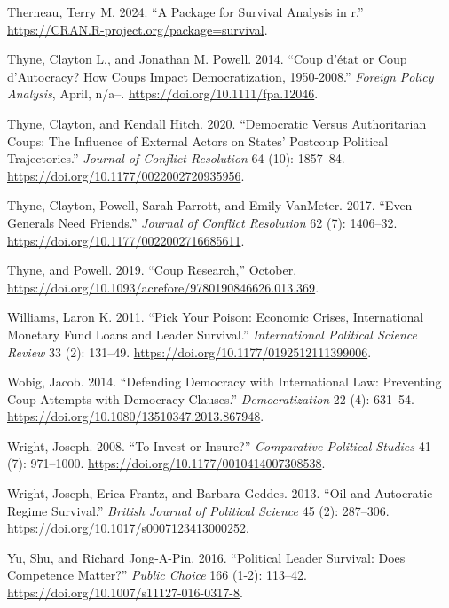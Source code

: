 \documentclass[
  12pt,
]{report}
\newlength{\cslhangindent}
\newenvironment{CSLReferences}[2] %
 {\begin{list}{}{%
  \setlength{\itemindent}{0pt}
  \setlength{\leftmargin}{0pt}
  \setlength{\parsep}{0pt}
  \ifodd #1
   \setlength{\leftmargin}{\cslhangindent}
   \setlength{\itemindent}{-1\cslhangindent}
  \fi
  \setlength{\itemsep}{#2\baselineskip}}}
 {\end{list}}
\begin{document}
\begin{CSLReferences}{1}{0}
Therneau, Terry M. 2024. {``A Package for Survival Analysis in r.''}
\url{https://CRAN.R-project.org/package=survival}.

Thyne, Clayton L., and Jonathan M. Powell. 2014. {``Coup d{'}état or
Coup d'Autocracy? How Coups Impact Democratization, 1950-2008.''}
\emph{Foreign Policy Analysis}, April, n/a--.
\url{https://doi.org/10.1111/fpa.12046}.

Thyne, Clayton, and Kendall Hitch. 2020. {``Democratic Versus
Authoritarian Coups: The Influence of External Actors on States{'}
Postcoup Political Trajectories.''} \emph{Journal of Conflict
Resolution} 64 (10): 1857--84.
\url{https://doi.org/10.1177/0022002720935956}.

Thyne, Clayton, Powell, Sarah Parrott, and Emily VanMeter. 2017. {``Even
Generals Need Friends.''} \emph{Journal of Conflict Resolution} 62 (7):
1406--32. \url{https://doi.org/10.1177/0022002716685611}.

Thyne, and Powell. 2019. {``Coup Research,''} October.
\url{https://doi.org/10.1093/acrefore/9780190846626.013.369}.

Williams, Laron K. 2011. {``Pick Your Poison: Economic Crises,
International Monetary Fund Loans and Leader Survival.''}
\emph{International Political Science Review} 33 (2): 131--49.
\url{https://doi.org/10.1177/0192512111399006}.

Wobig, Jacob. 2014. {``Defending Democracy with International Law:
Preventing Coup Attempts with Democracy Clauses.''}
\emph{Democratization} 22 (4): 631--54.
\url{https://doi.org/10.1080/13510347.2013.867948}.

Wright, Joseph. 2008. {``To Invest or Insure?''} \emph{Comparative
Political Studies} 41 (7): 971--1000.
\url{https://doi.org/10.1177/0010414007308538}.

Wright, Joseph, Erica Frantz, and Barbara Geddes. 2013. {``Oil and
Autocratic Regime Survival.''} \emph{British Journal of Political
Science} 45 (2): 287--306.
\url{https://doi.org/10.1017/s0007123413000252}.

Yu, Shu, and Richard Jong-A-Pin. 2016. {``Political Leader Survival:
Does Competence Matter?''} \emph{Public Choice} 166 (1-2): 113--42.
\url{https://doi.org/10.1007/s11127-016-0317-8}.

\end{CSLReferences}
\end{document}
